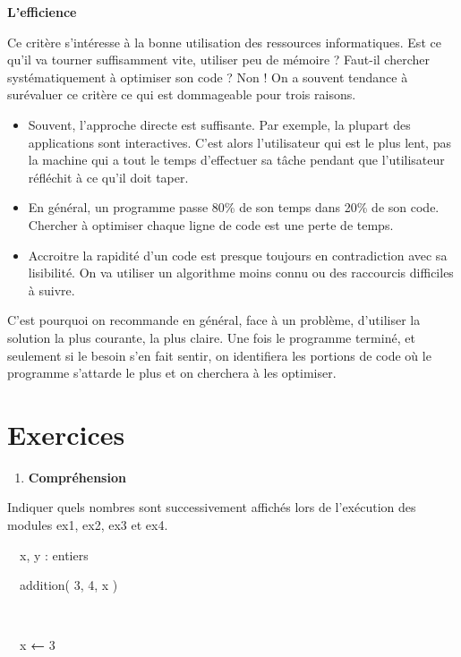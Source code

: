 {\sffamily\bfseries\upshape
L'efficience}

{
Ce critère s'intéresse à la bonne utilisation des
ressources informatiques. Est ce qu'il va tourner
suffisamment vite, utiliser peu de mémoire ? Faut-il chercher
systématiquement à optimiser son code ? Non ! On a souvent tendance à
surévaluer ce critère ce qui est dommageable pour trois raisons.}

\liststyleListv
\begin{itemize}
\item {
Souvent, l'approche directe est suffisante. Par
exemple, la plupart des applications sont interactives.
C'est alors l’utilisateur qui est le plus lent, pas la
machine qui a tout le temps d'effectuer sa tâche
pendant que l’utilisateur réfléchit à ce qu'il doit
taper.}
\item {
En général, un programme passe 80\% de son temps dans 20\% de son code.
Chercher à optimiser chaque ligne de code est une perte de temps.}
\item {
Accroitre la rapidité d'un code est presque toujours en
contradiction avec sa lisibilité. On va utiliser un algorithme moins
connu ou des raccourcis difficiles à suivre.}
\end{itemize}
{
C'est pourquoi on recommande en général, face à un
problème, d'utiliser la solution la plus courante, la
plus claire. Une fois le programme terminé, et seulement si le besoin
s'en fait sentir, on identifiera les portions de code
où le programme s'attarde le plus et on cherchera à
les optimiser.}

\section[Exercices]{\bfseries Exercices}
\liststyleExercice
\begin{enumerate}
\item {\sffamily\bfseries
Compréhension}
\end{enumerate}
{
Indiquer quels nombres sont successivement affichés lors de l’exécution
des modules ex1, ex2, ex3 et ex4.}


\bigskip

{\sffamily
{}}

{\sffamily
\ \ x, y : entiers\ \ }

{\sffamily
\ \ addition( 3, 4, x )}

{\sffamily
{\ \ }}

{\sffamily
{\ \ x
}{\textbf{←}}{ 3}}

